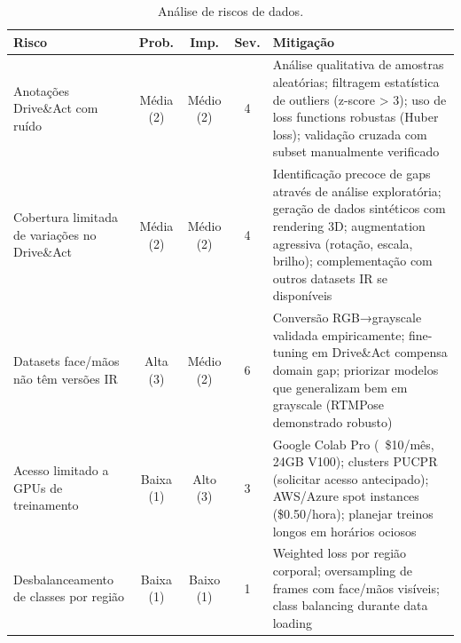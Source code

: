 \documentclass[12pt, a4paper]{article}
\begin{document}
\begin{table}[H]
    \centering
    \caption{Análise de riscos de dados.}
    \small
    \begin{tabular}{|p{3.5cm}|c|c|c|p{4cm}|}
        \hline
        \textbf{Risco} & \textbf{Prob.} & \textbf{Imp.} & \textbf{Sev.} & \textbf{Mitigação} \\ \hline
        
        Anotações Drive\&Act com ruído & 
        Média (2) & 
        Médio (2) & 
        4 & 
        Análise qualitativa de amostras aleatórias; filtragem estatística de outliers (z-score > 3); uso de loss functions robustas (Huber loss); validação cruzada com subset manualmente verificado \\ \hline
        
        Cobertura limitada de variações no Drive\&Act & 
        Média (2) & 
        Médio (2) & 
        4 & 
        Identificação precoce de gaps através de análise exploratória; geração de dados sintéticos com rendering 3D; augmentation agressiva (rotação, escala, brilho); complementação com outros datasets IR se disponíveis \\ \hline
        
        Datasets face/mãos não têm versões IR & 
        Alta (3) & 
        Médio (2) & 
        6 & 
        Conversão RGB→grayscale validada empiricamente; fine-tuning em Drive\&Act compensa domain gap; priorizar modelos que generalizam bem em grayscale (RTMPose demonstrado robusto) \\ \hline
        
        Acesso limitado a GPUs de treinamento & 
        Baixa (1) & 
        Alto (3) & 
        3 & 
        Google Colab Pro (~\$10/mês, 24GB V100); clusters PUCPR (solicitar acesso antecipado); AWS/Azure spot instances (\$0.50/hora); planejar treinos longos em horários ociosos \\ \hline
        
        Desbalanceamento de classes por região & 
        Baixa (1) & 
        Baixo (1) & 
        1 & 
        Weighted loss por região corporal; oversampling de frames com face/mãos visíveis; class balancing durante data loading \\ \hline
        
    \end{tabular}
\end{table}
\end{document}
